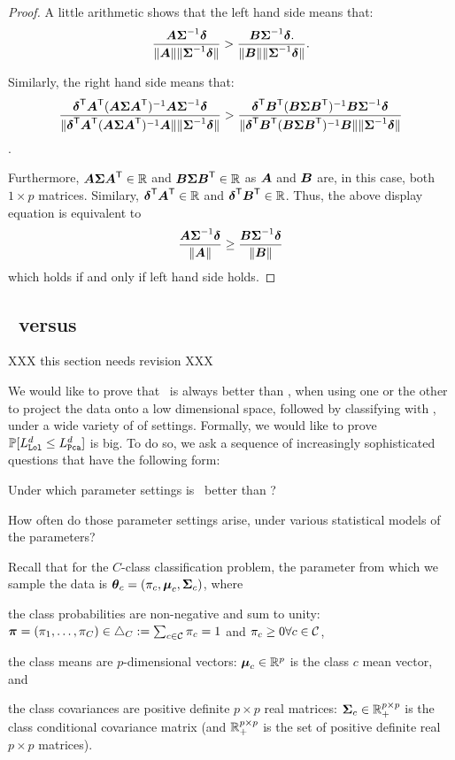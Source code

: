 \documentclass[10pt]{article}
\begin{document}
\begin{proof}
A little arithmetic shows that the left hand side means that:
$$\frac{\boldsymbol{A} \boldsymbol{\Sigma}^{-1} \boldsymbol{\delta}}{\|\boldsymbol{A}\| \|\boldsymbol{\Sigma}^{-1} \boldsymbol{\delta}\|} > \frac{\boldsymbol{B} \boldsymbol{\Sigma}^{-1} \boldsymbol{\delta}.}{\|\boldsymbol{B}\| \|\boldsymbol{\Sigma}^{-1} \boldsymbol{\delta}\|}. $$

Similarly, the right hand side means that:
$$\frac{\boldsymbol{\delta}^{\mathsf{T}} \boldsymbol{A}^{\mathsf{T}} (\boldsymbol{A} \boldsymbol{\Sigma} \boldsymbol{A}^{\mathsf{T}})^{-1} \boldsymbol{A} \boldsymbol{\Sigma}^{-1} \boldsymbol{\delta}}{\|\boldsymbol{\delta}^{\mathsf{T}} \boldsymbol{A}^{\mathsf{T}} (\boldsymbol{A} \boldsymbol{\Sigma} \boldsymbol{A}^{\mathsf{T}})^{-1} \boldsymbol{A}\| \|\boldsymbol{\Sigma}^{-1} \boldsymbol{\delta}\|} > \frac{\boldsymbol{\delta}^{\mathsf{T}} \boldsymbol{B}^{\mathsf{T}} (\boldsymbol{B} \boldsymbol{\Sigma} \boldsymbol{B}^{\mathsf{T}})^{-1} \boldsymbol{B} \boldsymbol{\Sigma}^{-1} \boldsymbol{\delta}}{\|\boldsymbol{\delta}^{\mathsf{T}} \boldsymbol{B}^{\mathsf{T}} (\boldsymbol{B} \boldsymbol{\Sigma} \boldsymbol{B}^{\mathsf{T}})^{-1} \boldsymbol{B}\| \|\boldsymbol{\Sigma}^{-1} \boldsymbol{\delta} \|}$$.

Furthermore, $\boldsymbol{A} \boldsymbol{\Sigma} \boldsymbol{A}^{\mathsf{T}} \in \mathbb{R}$ and $\boldsymbol{B} \boldsymbol{\Sigma} \boldsymbol{B}^{\mathsf{T}} \in \mathbb{R}$ as $\boldsymbol{A}$ and $\boldsymbol{B}$ are, in this case, both $1 \times p$ matrices. 
Similary, $\boldsymbol{\delta}^{\mathsf{T}} \boldsymbol{A}^{\mathsf{T}} \in \mathbb{R}$ and $\boldsymbol{\delta}^{\mathsf{T}} \boldsymbol{B}^{\mathsf{T}} \in \mathbb{R}$. Thus, the above display equation is equivalent to
$$\frac{\boldsymbol{A} \boldsymbol{\Sigma}^{-1} \boldsymbol{\delta}}{\|\boldsymbol{A}\|} \geq \frac{\boldsymbol{B} \boldsymbol{\Sigma}^{-1} \boldsymbol{\delta}}{\|\boldsymbol{B}\|}$$
which holds if and only if left hand side holds.
\end{proof}



\newpage
\subsection{\Pca~versus \Lol} \label{sec:pvl}


XXX this section needs revision XXX

We would like to prove that \Lol~is always better than \Pca, when using one or the other to project the data onto a low dimensional space, followed by classifying with \Lda, under a wide variety of of settings.  Formally, we would like to prove $\mathbb{P}[L_{{\sc \texttt{Lol}}}^d \leq L_{{\sc \texttt{Pca}}}^d]$ is big.  To do so, we ask a sequence of increasingly sophisticated questions that have the following form:
\begin{compactenum}
\item Under which parameter settings is \Lol~better than \Pca?
\item How often do those parameter settings arise, under various statistical models of the parameters?
\end{compactenum}


Recall that for the $C$-class classification problem, the parameter from which we sample the data is $\boldsymbol{\theta}_c=(\pi_c,\boldsymbol{\mu}_c,\boldsymbol{\Sigma}_c)$, where

\begin{compactitem}
\item the class probabilities are non-negative and sum to unity: $\boldsymbol{\pi}=(\pi_1,\ldots,\pi_C) \in \triangle_C := \sum_{c \in \mathcal{C}} \pi_c = 1$ and $\pi_c \geq 0 \forall c \in \mathcal{C}$,
\item the class means are $p$-dimensional vectors: $\boldsymbol{\mu}_c \in \mathbb{R}^{p}$ is the class $c$ mean vector, and
\item the class covariances are positive definite $p \times p$ real matrices: $\boldsymbol{\Sigma}_c  \in \mathbb{R}^{p \times p}_+$ is the class conditional covariance matrix (and $\mathbb{R}^{p \times p}_+$ is the set of positive definite real $p\times p$ matrices).
\end{compactitem}
\end{document}
